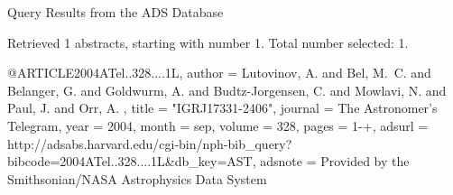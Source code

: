 Query Results from the ADS Database


Retrieved 1 abstracts, starting with number 1.  Total number selected: 1.

@ARTICLE{2004ATel..328....1L,
   author = {{Lutovinov}, A. and {Bel}, M.~C. and {Belanger}, G. and {Goldwurm}, A. and 
	{Budtz-Jorgensen}, C. and {Mowlavi}, N. and {Paul}, J. and {Orr}, A.
	},
    title = "{IGRJ17331-2406}",
  journal = {The Astronomer's Telegram},
     year = 2004,
    month = sep,
   volume = 328,
    pages = {1-+},
   adsurl = {http://adsabs.harvard.edu/cgi-bin/nph-bib_query?bibcode=2004ATel..328....1L&db_key=AST},
  adsnote = {Provided by the Smithsonian/NASA Astrophysics Data System}
}


